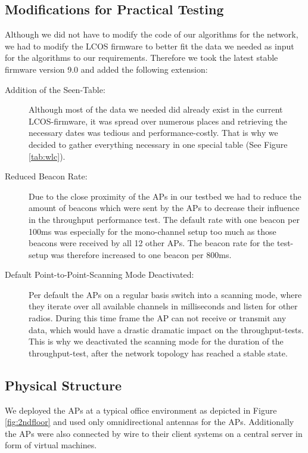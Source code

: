     \subsection{Modifications for Practical Testing}
      Although we did not have to modify the code of our algorithms for the network, we had to modify the \ac{LCOS} firmware to better fit the 
      data we needed as input for the algorithms to our requirements.
      Therefore we took the latest stable firmware version 9.0 and added the following extension:
      \begin{description}
	\item[Addition of the Seen-Table:]
	  Although most of the data we needed did already exist in the current \ac{LCOS}-firmware,
	  it was spread over numerous places and retrieving the necessary dates was tedious and performance-costly.
	  That is why we decided to gather everything necessary in one special table (See Figure \ref{tab:wlc}).
	\item[Reduced Beacon Rate:]
	  Due to the close proximity of the APs in our testbed we had to reduce the amount of beacons which were sent by the APs to decrease their influence in 
	  the throughput performance test.
	  The default rate with one beacon per 100ms was especially for the mono-channel setup too much as those beacons were received by all 12 other APs.
	  The beacon rate for the test-setup was therefore increased to one beacon per 800ms.
	\item[Default Point-to-Point-Scanning Mode Deactivated:]
	  Per default the APs on a regular basis switch into a scanning mode, where they iterate over all available channels in milliseconds and listen for other radios.
	  During this time frame the AP can not receive or transmit any data, which would have a drastic dramatic impact on the throughput-tests.
	  This is why we deactivated the scanning mode for the duration of the throughput-test, after the network topology has reached a stable state.
      \end{description}
   
\newpage
   
    \subsection{Physical Structure}
      We deployed the APs at a typical office environment as depicted in Figure \ref{fig:2ndfloor} and used only omnidirectional antennas for the APs.
      Additionally the APs were also connected by wire to their client systems on a central server in form of virtual machines.
      
